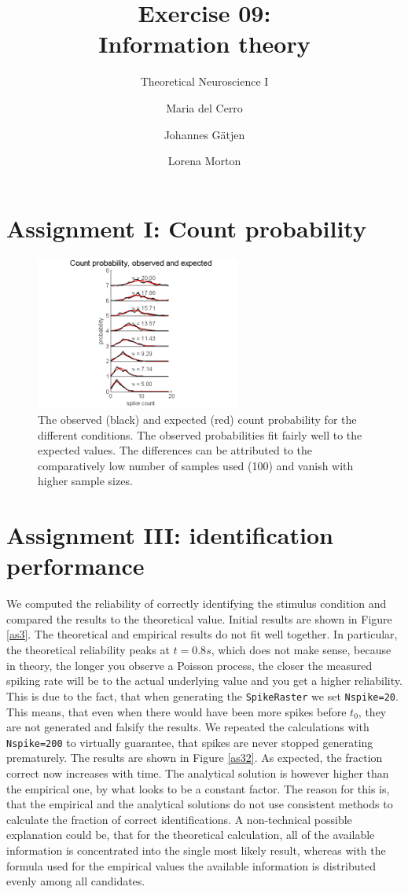 \documentclass{scrartcl}
\title{Exercise 09:\\Information theory}
\subtitle{Theoretical Neuroscience I}
\author{Maria del Cerro \and Johannes G\"atjen \and Lorena Morton}
\begin{document}
\maketitle
\section{Assignment I: Count probability}

\begin{figure}[h]
\centering
\includegraphics[trim = {1.3cm 0 1.5cm 0.1cm}, width=0.6\textwidth, clip]{../pics/as1}
\caption{The observed (black) and expected (red) count probability for the different conditions. The observed probabilities fit fairly well to the expected values. The differences can be attributed to the comparatively low number of samples used (100) and vanish with higher sample sizes.}
\label{as1}
\end{figure}

\section{Assignment III: identification performance}

We computed the reliability of correctly identifying the stimulus condition and compared the results to the theoretical value. Initial results are shown in Figure \ref{as3}. The theoretical and empirical results do not fit well together. In particular, the theoretical reliability peaks at $t=0.8\si{s}$, which does not make sense, because in theory, the longer you observe a Poisson process, the closer the measured spiking rate will be to the actual underlying value and you get a higher reliability. This is due to the fact, that when generating the \texttt{SpikeRaster} we set \texttt{Nspike=20}. This means, that even when there would have been more spikes before $t_0$, they are not generated and falsify the results. We repeated the calculations with \texttt{Nspike=200} to virtually guarantee, that spikes are never stopped generating prematurely. The results are shown in Figure \ref{as32}. As expected, the fraction correct now increases with time. The analytical solution is however higher than the empirical one, by what looks to be a constant factor. The reason for this is, that the empirical and the analytical solutions do not use consistent methods to calculate the fraction of correct identifications. A non-technical possible explanation could be, that for the theoretical calculation, all of the available information is concentrated into the single most likely result, whereas with the formula used for the empirical values the available information is distributed evenly among all candidates.
\end{document}
